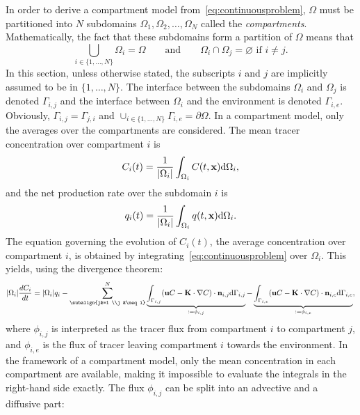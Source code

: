In order to derive a compartment model from~\eqref{eq:continuousproblem}, $\Omega$ must be partitioned into $N$ subdomains $\Omega_1,\Omega_2,\dots,\Omega_N$ called the \textit{compartments}. Mathematically, the fact that these subdomains form a partition of $\Omega$ means that
\begin{equation}
	\bigcup_{i \in\{1,\dots,N\}} \Omega_i = \Omega \qquad \mbox{and} \qquad \Omega_i \cap \Omega_j = \varnothing \mbox{ if } i \neq j.
\end{equation}
In this section, unless otherwise stated, the subscripts $i$ and $j$ are implicitly assumed to be in $\{1,\dots,N\}$. The interface between the subdomains $\Omega_i$ and $\Omega_j$ is denoted $\Gamma_{i,j}$ and the interface between $\Omega_i$ and the environment is denoted $\Gamma_{i,e}$. Obviously, $\Gamma_{i,j} = \Gamma_{j,i}$ and $\cup_{i\in\{1,\dots,N\}} \Gamma_{i,e} = \partial \Omega$. In a compartment model, only the averages over the compartments are considered. The mean tracer concentration over compartment $i$ is 
\begin{equation} \label{eq:C_i(t)}
	C_i(t) = \frac{1}{|\Omega_i|} \int_{\Omega_i} C(t,\mathbf x) \mathrm d\Omega_i,
\end{equation}
and the net production rate over the subdomain $i$ is
\begin{equation}
	q_i(t) =  \frac{1}{|\Omega_i|} \int_{\Omega_i} q(t,\mathbf x) \mathrm d\Omega_i.
\end{equation}
The equation governing the evolution of $C_i(t)$, the average concentration over compartment $i$, is obtained by integrating~\eqref{eq:continuousproblem} over $\Omega_i$. This yields, using the divergence theorem:
\begin{equation}
	|\Omega_i| \frac{d C_i}{d t} = |\Omega_i| q_i - \sum_{\subalign{j&=1 \\j &\neq i}}^N \underbrace{\int_{\Gamma_{i,j}} (\b u C - \b K \cdot \nabla C)\cdot \b n_{i,j} \rm d\Gamma_{i,j}}_{:= \phi_{i,j}} - \underbrace{\int_{\Gamma_{i,e}} (\b u C - \b K \cdot \nabla C)\cdot \b n_{i,e} \rm d\Gamma_{i,e}}_{:= \phi_{i,e}},
\end{equation}
where $\phi_{i,j}$ is interpreted as the tracer flux from compartment $i$ to compartment $j$, and $\phi_{i,e}$ is the flux of tracer leaving compartment $i$ towards the environment. In the framework of a compartment model, only the mean concentration in each compartment are available, making it impossible to evaluate the integrals in the right-hand side exactly. The flux $\phi_{i,j}$ can be split into an advective and a diffusive part:
